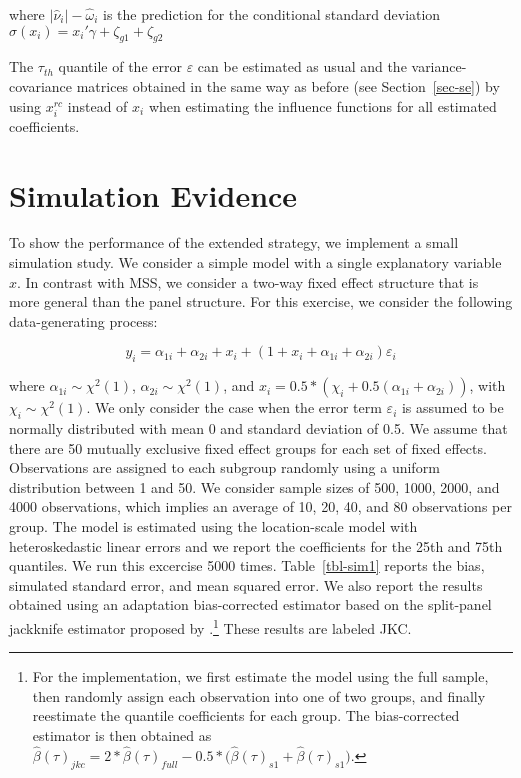 \documentclass[
  authoryear,
  review,
  1p]{elsarticle}
\begin{document}
where \(|\hat\nu_{i}|- \hat \omega_{i}\) is the prediction for the
conditional standard deviation
\(\sigma(x_i)=x_{i}' \gamma + \zeta_{g1} + \zeta_{g2}\)

The \(\tau_{th}\) quantile of the error \(\varepsilon\) can be estimated
as usual and the variance-covariance matrices obtained in the same way
as before (see Section~\ref{sec-se}) by using \(x_{i}^{rc}\) instead of
\(x_{i}\) when estimating the influence functions for all estimated
coefficients.

\hypertarget{simulation-evidence}{%
\section{Simulation Evidence}\label{simulation-evidence}}

To show the performance of the extended strategy, we implement a small
simulation study. We consider a simple model with a single explanatory
variable \(x\). In contrast with MSS, we consider a two-way fixed effect
structure that is more general than the panel structure. For this
exercise, we consider the following data-generating process:

\[y_i = \alpha_{1i} + \alpha_{2i} + x_i + (1+x_i + \alpha_{1i} + \alpha_{2i} ) \varepsilon_i
\]

where \(\alpha_{1i}\sim \chi^2(1)\), \(\alpha_{2i} \sim \chi^2(1)\), and
\(x_i = 0.5 * (\chi_i +0.5(\alpha_{1i}+\alpha_{2i}))\), with
\(\chi_i \sim \chi^2(1)\). We only consider the case when the error term
\(\varepsilon_i\) is assumed to be normally distributed with mean 0 and
standard deviation of 0.5. We assume that there are 50 mutually
exclusive fixed effect groups for each set of fixed effects.
Observations are assigned to each subgroup randomly using a uniform
distribution between 1 and 50. We consider sample sizes of 500, 1000,
2000, and 4000 observations, which implies an average of 10, 20, 40, and
80 observations per group. The model is estimated using the
location-scale model with heteroskedastic linear errors and we report
the coefficients for the 25th and 75th quantiles. We run this excercise
5000 times. Table~\ref{tbl-sim1} reports the bias, simulated standard
error, and mean squared error. We also report the results obtained using
an adaptation bias-corrected estimator based on the split-panel
jackknife estimator proposed by \citet{dhaene2015}.\footnote{For the
  implementation, we first estimate the model using the full sample,
  then randomly assign each observation into one of two groups, and
  finally reestimate the quantile coefficients for each group. The
  bias-corrected estimator is then obtained as
  \(\hat\beta(\tau)_{jkc}=2*\hat\beta(\tau)_{full}-0.5*\big(\hat\beta(\tau)_{s1}+\hat\beta(\tau)_{s1}\big)\).}
These results are labeled JKC.
\end{document}
